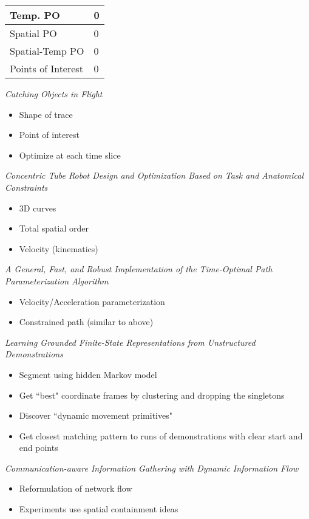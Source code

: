 \documentclass[12pt]{article}
\begin{document}
\begin{table}[h]
\begin{tabular}{|l|l|}
\hline
Temp. PO &  0\\ \hline
Spatial PO & 0  \\ \hline
Spatial-Temp PO & 0 \\ \hline
Points of Interest & 0 \\ \hline
\end{tabular}
\end{table}

{\sl Catching Objects in Flight}
\cite{kim2014catching}
\begin{itemize}
  \item Shape of trace
  \item Point of interest
  \item Optimize at each time slice
\end{itemize}

{\sl Concentric Tube Robot Design and Optimization
Based on Task and Anatomical Constraints}
\cite{bergelesconcentric}
\begin{itemize}
  \item 3D curves
  \item Total spatial order
  \item Velocity (kinematics)
\end{itemize}

{\sl A General, Fast, and Robust Implementation of the
Time-Optimal Path Parameterization Algorithm}
\cite{pham2014general}
\begin{itemize}
  \item Velocity/Acceleration parameterization
  \item Constrained path (similar to above)
\end{itemize}

{\sl Learning Grounded Finite-State Representations
from Unstructured Demonstrations}
\cite{niekum2014learning}
\begin{itemize}
  \item Segment using hidden Markov model
  \item Get ``best" coordinate frames by clustering
        and dropping the singletons
  \item Discover ``dynamic movement primitives"
  \item Get closest matching pattern to runs of
        demonstrations with clear start and end points
\end{itemize}

{\sl Communication-aware Information Gathering with
Dynamic Information Flow}
\cite{kassir2014communication}
\begin{itemize}
  \item Reformulation of network flow
  \item Experiments use spatial containment ideas
\end{itemize}
\end{document}
